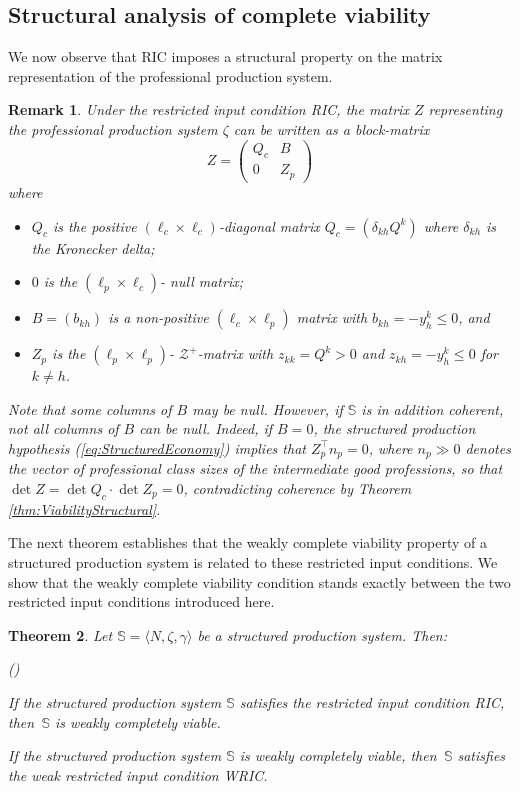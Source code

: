 \documentclass[11pt,fleqn]{article}
\newcounter{llst}
\newenvironment{abet}{\begin{list}{\rm (\alph{llst})}{\usecounter{llst}
		\setlength{\itemindent}{0em} \setlength{\leftmargin}{3em}
		\setlength{\labelwidth}{2em} \setlength{\labelsep}{1em}}}{\end{list}}
\newtheorem{theorem}{Theorem}[section]
\newtheorem{remark}[theorem]{Remark}
\begin{document}
\subsection{Structural analysis of complete viability}\label{sec: Structural analysis of complete viability}

We now observe that RIC imposes a structural property on the matrix representation of the professional production system. 

\begin{remark}\label{rem: Z block matrix}
	Under the restricted input condition RIC, the matrix $Z$ representing the professional production system $\zeta$ can be written as a block-matrix 
	\[
	Z=
	\begin{pmatrix}
	Q_c&B \\
	0&Z_p			
	\end{pmatrix}
	\] 
	where 
	\begin{itemize}
		\item[] $Q_c$ is the positive $(\ell_c \times \ell_c)$-diagonal matrix $Q_c=(\delta_{kh}Q^k)$  where $\delta_{kh}$ is the Kronecker delta; 
		\item[] $0$ is the $(\ell_p\times \ell_c)$- null matrix; 
		\item[] $B=(b_{kh})$ is a non-positive $(\ell_c \times \ell_p)$ matrix with $b_{kh}=-y^k_h\leqslant 0$, and
		\item[] $Z_p$ is the $(\ell_p\times \ell_p)$- $\mathcal{Z}^+$-matrix with $z_{kk}=Q^k>0$ and $z_{kh}=-y^k_h\leqslant 0$ for $k \neq h$.
	\end{itemize}
	Note that some columns of $B$ may be null. However, if $\mathbb S$ is in addition coherent, not all columns of $B$ can be null. Indeed, if $B=0$, the structured production hypothesis (\ref{eq:StructuredEconomy}) implies that $Z_p^\top n_p =0$, where $n_p \gg 0$ denotes the vector of professional class sizes of the intermediate good professions, so that $\det Z = \det Q_c \cdot \det Z_p = 0$, contradicting coherence by Theorem \ref{thm:ViabilityStructural}.
\end{remark}

\noindent
The next theorem establishes that the weakly complete viability property of a structured production system is related to these restricted input conditions. We show that the weakly complete viability condition stands exactly between the two restricted input conditions introduced here. 

\begin{theorem} \label{thm:CompleteViable}
	Let $\mathbb S = \langle N, \zeta , \gamma \rangle$ be a structured production system. Then:
	\begin{abet}
		\item If the structured production system $\mathbb S$ satisfies the restricted input condition RIC, then $\, \mathbb S$ is weakly completely viable.
		\item If the structured production system $\mathbb S$ is weakly completely viable, then $\, \mathbb S$ satisfies the weak restricted input condition WRIC.
	\end{abet}
\end{theorem}
\end{document}
